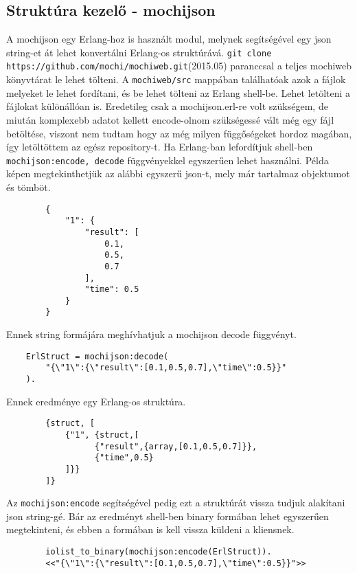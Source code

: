 \subsection{Struktúra kezelő - mochijson \label{subsec:mochijson}}
	A mochijson egy Erlang-hoz is használt modul, melynek segítségével egy json string-et át lehet konvertálni Erlang-os struktúrává. \newline 
	\texttt{git clone https://github.com/mochi/mochiweb.git}(2015.05)
	paranccsal a teljes mochiweb könyvtárat le lehet tölteni. A \texttt{mochiweb/src} mappában találhatóak azok a fájlok melyeket le lehet fordítani, és be lehet tölteni az Erlang shell-be. Lehet letölteni a fájlokat különállóan is. \newline
	Eredetileg csak a mochijson.erl-re volt szükségem, de miután komplexebb adatot kellett encode-olnom szükségessé vált még egy fájl betöltése, viszont nem tudtam hogy az még milyen függőségeket hordoz magában, így letöltöttem az egész repository-t. \newline
	Ha Erlang-ban lefordítjuk shell-ben \texttt{mochijson:encode, decode} függvényekkel egyszerűen lehet használni.\newline 
	Példa képen megtekinthetjük az alábbi egyszerű json-t, mely már tartalmaz objektumot és tömböt.
	\begin{verbatim}
		{
		    "1": {
		        "result": [
		            0.1,
		            0.5,
		            0.7
		        ],
		        "time": 0.5
		    }
		}
	\end{verbatim}
	Ennek string formájára meghívhatjuk a mochijson decode függvényt.
	\begin{verbatim}
	ErlStruct = mochijson:decode(
	    "{\"1\":{\"result\":[0.1,0.5,0.7],\"time\":0.5}}"
	).
	\end{verbatim}
	Ennek eredménye egy Erlang-os struktúra.
	\begin{verbatim}
		{struct, [
		    {"1", {struct,[
		          {"result",{array,[0.1,0.5,0.7]}},
		          {"time",0.5}
		    ]}}
		]}
	\end{verbatim}
	Az \texttt{mochijson:encode} segítségével pedig ezt a struktúrát vissza tudjuk alakítani json string-gé. Bár az eredményt shell-ben binary formában lehet egyszerűen megtekinteni, és ebben a formában is kell vissza küldeni a kliensnek. 
	\begin{verbatim}
		iolist_to_binary(mochijson:encode(ErlStruct)).
		<<"{\"1\":{\"result\":[0.1,0.5,0.7],\"time\":0.5}}">>
	\end{verbatim}


